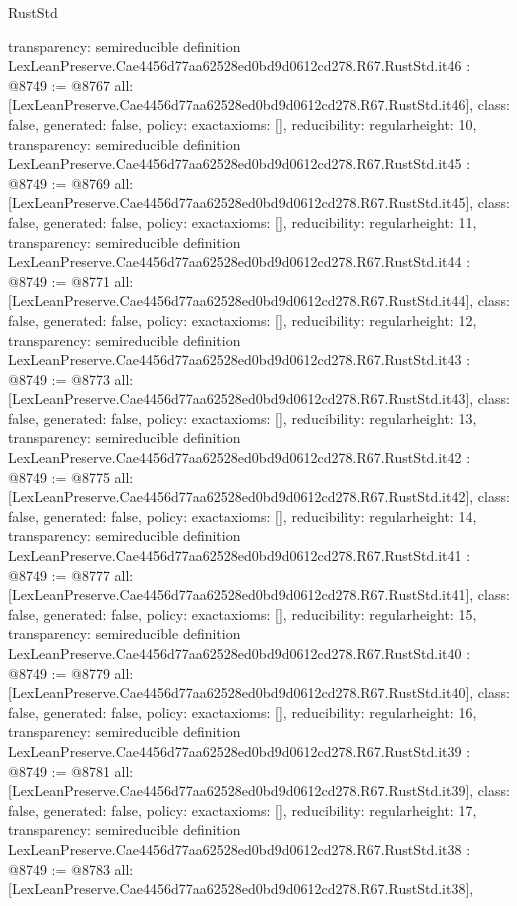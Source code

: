 \begin{lexlean}{RustStd}
\begin{coremodule}
{  transparency: semireducible
}
definition LexLeanPreserve.Cae4456d77aa62528ed0bd9d0612cd278.R67.RustStd.it46 : @8749 := @8767 {
  all: [LexLeanPreserve.Cae4456d77aa62528ed0bd9d0612cd278.R67.RustStd.it46],
  class: false,
  generated: false,
  policy: exact{axioms: []},
  reducibility: regular{height: 10},
  transparency: semireducible
}
definition LexLeanPreserve.Cae4456d77aa62528ed0bd9d0612cd278.R67.RustStd.it45 : @8749 := @8769 {
  all: [LexLeanPreserve.Cae4456d77aa62528ed0bd9d0612cd278.R67.RustStd.it45],
  class: false,
  generated: false,
  policy: exact{axioms: []},
  reducibility: regular{height: 11},
  transparency: semireducible
}
definition LexLeanPreserve.Cae4456d77aa62528ed0bd9d0612cd278.R67.RustStd.it44 : @8749 := @8771 {
  all: [LexLeanPreserve.Cae4456d77aa62528ed0bd9d0612cd278.R67.RustStd.it44],
  class: false,
  generated: false,
  policy: exact{axioms: []},
  reducibility: regular{height: 12},
  transparency: semireducible
}
definition LexLeanPreserve.Cae4456d77aa62528ed0bd9d0612cd278.R67.RustStd.it43 : @8749 := @8773 {
  all: [LexLeanPreserve.Cae4456d77aa62528ed0bd9d0612cd278.R67.RustStd.it43],
  class: false,
  generated: false,
  policy: exact{axioms: []},
  reducibility: regular{height: 13},
  transparency: semireducible
}
definition LexLeanPreserve.Cae4456d77aa62528ed0bd9d0612cd278.R67.RustStd.it42 : @8749 := @8775 {
  all: [LexLeanPreserve.Cae4456d77aa62528ed0bd9d0612cd278.R67.RustStd.it42],
  class: false,
  generated: false,
  policy: exact{axioms: []},
  reducibility: regular{height: 14},
  transparency: semireducible
}
definition LexLeanPreserve.Cae4456d77aa62528ed0bd9d0612cd278.R67.RustStd.it41 : @8749 := @8777 {
  all: [LexLeanPreserve.Cae4456d77aa62528ed0bd9d0612cd278.R67.RustStd.it41],
  class: false,
  generated: false,
  policy: exact{axioms: []},
  reducibility: regular{height: 15},
  transparency: semireducible
}
definition LexLeanPreserve.Cae4456d77aa62528ed0bd9d0612cd278.R67.RustStd.it40 : @8749 := @8779 {
  all: [LexLeanPreserve.Cae4456d77aa62528ed0bd9d0612cd278.R67.RustStd.it40],
  class: false,
  generated: false,
  policy: exact{axioms: []},
  reducibility: regular{height: 16},
  transparency: semireducible
}
definition LexLeanPreserve.Cae4456d77aa62528ed0bd9d0612cd278.R67.RustStd.it39 : @8749 := @8781 {
  all: [LexLeanPreserve.Cae4456d77aa62528ed0bd9d0612cd278.R67.RustStd.it39],
  class: false,
  generated: false,
  policy: exact{axioms: []},
  reducibility: regular{height: 17},
  transparency: semireducible
}
definition LexLeanPreserve.Cae4456d77aa62528ed0bd9d0612cd278.R67.RustStd.it38 : @8749 := @8783 {
  all: [LexLeanPreserve.Cae4456d77aa62528ed0bd9d0612cd278.R67.RustStd.it38],
}
\end{coremodule}
\end{lexlean}
